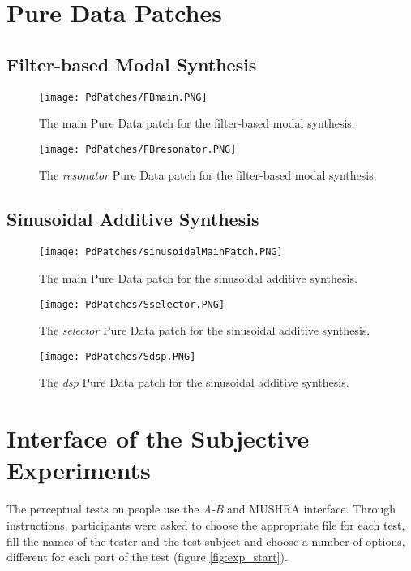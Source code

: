 \chapter{Pure Data Patches}\label{ap:pd_patches}

\section{Filter-based Modal Synthesis}
\begin{figure}[H]
  \centering
    \texttt{[image: PdPatches/FBmain.PNG]}
      \caption{The main Pure Data patch for the filter-based modal synthesis.}
      \label{fig:FBmain}
\end{figure}

\begin{figure}[H]
  \centering
    \texttt{[image: PdPatches/FBresonator.PNG]}
      \caption{The \textit{resonator} Pure Data patch for the filter-based modal synthesis.}
      \label{fig:FBres}
\end{figure}

\section{Sinusoidal Additive Synthesis}

\begin{figure}[H]
  \centering
    \texttt{[image: PdPatches/sinusoidalMainPatch.PNG]}
      \caption{The main Pure Data patch for the sinusoidal additive synthesis.}
      \label{fig:Smain}
\end{figure}

\begin{figure}[H]
  \centering
    \texttt{[image: PdPatches/Sselector.PNG]}
      \caption{The \textit{selector} Pure Data patch for the sinusoidal additive synthesis.}
      \label{fig:Ssel}
\end{figure}

\begin{figure}[H]
  \centering
    \texttt{[image: PdPatches/Sdsp.PNG]}
      \caption{The \textit{dsp} Pure Data patch for the sinusoidal additive synthesis.}
      \label{fig:Sdsp}
\end{figure}

\chapter{Interface of the Subjective Experiments}\label{ap:experiments}
The perceptual tests on people use the \textit{A-B} and \gls{MUSHRA} interface. Through instructions, participants were asked to choose the appropriate file for each test, fill the names of the tester and the test subject and choose a number of options, different for each part of the test (figure \ref{fig:exp_start}).

